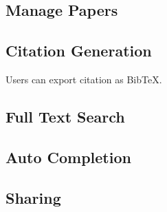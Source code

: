 \subsection{Manage Papers}

\subsection{Citation Generation}
Users can export citation as BibTeX.

\subsection{Full Text Search}

\subsection{Auto Completion}

\subsection{Sharing}
